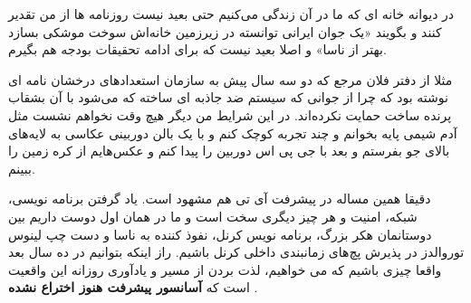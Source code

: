 در دیوانه خانه ای که ما در آن زندگی می‌کنیم حتی بعید نیست روزنامه ها از من تقدیر کنند و بگویند «یک جوان ایرانی توانسته در زیرزمین خانه‌اش سوخت موشکی بسازد بهتر از ناسا» و اصلا بعید نیست که برای ادامه تحقیقات بودجه هم بگیرم.

مثلا از دفتر فلان مرجع که دو سه سال پیش به سازمان استعدادهای درخشان نامه ای نوشته بود که چرا از جوانی که سیستم ضد جاذبه ای ساخته که می‌شود با آن بشقاب پرنده ساخت حمایت نکرده‌اند. در این شرایط من دیگر هیچ وقت نخواهم نشست مثل آدم شیمی پایه بخوانم و چند تجربه کوچک کنم و با یک بالن دوربینی عکاسی به لایه‌های بالای جو بفرستم و بعد با جی پی اس دوربین را پیدا کنم و عکس‌هایم از کره زمین را ببینم.

دقیقا همین مساله در پیشرفت آی تی هم مشهود است. یاد گرفتن برنامه نویسی، شبکه، امنیت و هر چیز دیگری سخت است و ما در همان اول دوست داریم بین دوستانمان هکر بزرگ، برنامه نویس کرنل، نفوذ کننده به ناسا و دست چپ لینوس توروالدز در پذیرش پچ‌های زمانبندی داخلی کرنل باشیم. راز اینکه بتوانیم در ده سال بعد واقعا چیزی باشیم که می خواهیم، لذت بردن از مسیر و یادآوری روزانه این واقعیت است که
\textbf{آسانسور پیشرفت هنوز اختراع نشده}
.

